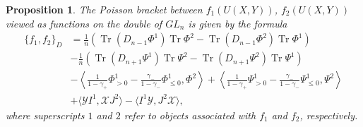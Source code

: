 \documentclass{amsart}
\newtheorem{proposition}[theorem]{Proposition}
\theoremstyle{definition}
\theoremstyle{remark}
\numberwithin{equation}{section}
\numberwithin{theorem}{section}
\begin{document}
\begin{proposition}\label{brack_uho}
The Poisson bracket between  $f_1(U(X,Y))$, $f_2(U(X,Y))$
viewed as functions on the double of $GL_n$ is given by the formula
\begin{equation}\label{brack_uho_form}
 \begin{split}
\{ f_1, f_2\}_D&= \frac{1}{n} \left ({\operatorname{Tr}}(D_{n-1} {\Phi}^1) {\operatorname{Tr}}{\Phi}^2 - {\operatorname{Tr}}(D_{n-1} {\Phi}^2) {\operatorname{Tr}}{\Phi}^1 \right)\\
&   - \frac{1}{n} \left ({\operatorname{Tr}}(D_{n+1} {\Psi}^1) {\operatorname{Tr}}{\Psi}^2 - {\operatorname{Tr}}(D_{n+1} {\Psi}^2) {\operatorname{Tr}}{\Psi}^1 \right) \\
&  - \left \langle  \frac{1}{1-\gamma_+} 
{\Phi}^1_{>0} - \frac{\gamma_-}{1-\gamma_-}{\Phi}^1_{\leq 0}, {\Phi}^2 \right \rangle
+ \left \langle  \frac{1}{1-\gamma_+} 
{\Psi}^1_{>0} - \frac{\gamma_-}{1-\gamma_-}{\Psi}^1_{\leq 0}, {\Psi}^2 \right \rangle\\ 
& + \langle {{\mathcal Y}} I^1, {{\mathcal X}} J^2\rangle 
-\langle  I^1{{\mathcal Y}},J^2{{\mathcal X}}\rangle,
\end{split}
\end{equation}
where superscripts $1$ and $2$ refer to objects associated with $f_1$ and $f_2$, respectively.
\end{proposition}
\end{document}
